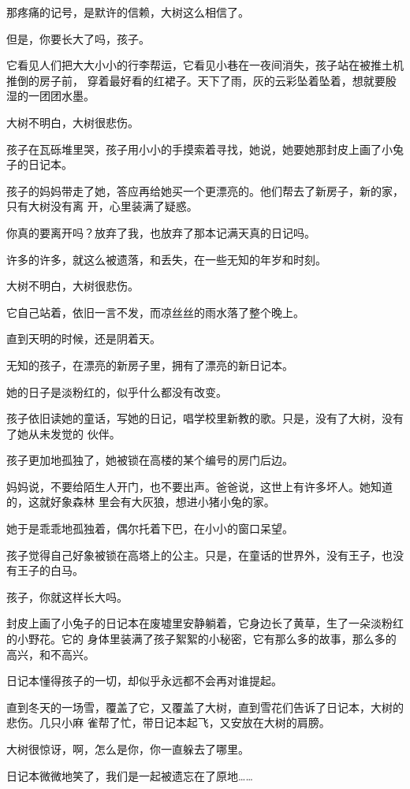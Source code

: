 \documentclass[12pt,a4paper]{article}
\begin{document}
		那疼痛的记号，是默许的信赖，大树这么相信了。

		但是，你要长大了吗，孩子。

		它看见人们把大大小小的行李帮运，它看见小巷在一夜间消失，孩子站在被推土机推倒的房子前，
	穿着最好看的红裙子。天下了雨，灰的云彩坠着坠着，想就要殷湿的一团团水墨。


		大树不明白，大树很悲伤。

		孩子在瓦砾堆里哭，孩子用小小的手摸索着寻找，她说，她要她那封皮上画了小兔子的日记本。

		孩子的妈妈带走了她，答应再给她买一个更漂亮的。他们帮去了新房子，新的家，只有大树没有离
	开，心里装满了疑惑。

		你真的要离开吗？放弃了我，也放弃了那本记满天真的日记吗。

		许多的许多，就这么被遗落，和丢失，在一些无知的年岁和时刻。


		大树不明白，大树很悲伤。

		它自己站着，依旧一言不发，而凉丝丝的雨水落了整个晚上。

		直到天明的时候，还是阴着天。


		无知的孩子，在漂亮的新房子里，拥有了漂亮的新日记本。

		她的日子是淡粉红的，似乎什么都没有改变。

		孩子依旧读她的童话，写她的日记，唱学校里新教的歌。只是，没有了大树，没有了她从未发觉的
	伙伴。


		孩子更加地孤独了，她被锁在高楼的某个编号的房门后边。

		妈妈说，不要给陌生人开门，也不要出声。爸爸说，这世上有许多坏人。她知道的，这就好象森林
	里会有大灰狼，想进小猪小兔的家。

		她于是乖乖地孤独着，偶尔托着下巴，在小小的窗口呆望。

		孩子觉得自己好象被锁在高塔上的公主。只是，在童话的世界外，没有王子，也没有王子的白马。


		孩子，你就这样长大吗。

		封皮上画了小兔子的日记本在废墟里安静躺着，它身边长了黄草，生了一朵淡粉红的小野花。它的
	身体里装满了孩子絮絮的小秘密，它有那么多的故事，那么多的高兴，和不高兴。

		日记本懂得孩子的一切，却似乎永远都不会再对谁提起。

		直到冬天的一场雪，覆盖了它，又覆盖了大树，直到雪花们告诉了日记本，大树的悲伤。几只小麻
	雀帮了忙，带日记本起飞，又安放在大树的肩膀。

		大树很惊讶，啊，怎么是你，你一直躲去了哪里。

		日记本微微地笑了，我们是一起被遗忘在了原地……
\end{document}
